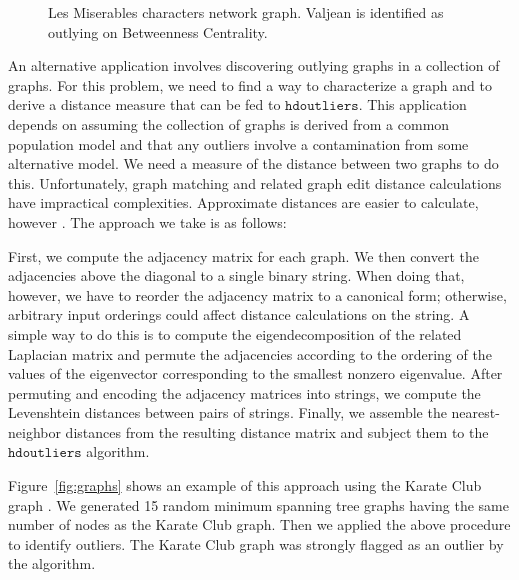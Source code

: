 \documentclass[12pt]{article}
\begin{document}
\begin{figure}[h]
\caption{\label{fig:lesmis} Les Miserables characters network graph. Valjean is identified as outlying on Betweenness Centrality.}
\end{figure}

An alternative application involves discovering outlying graphs in a collection of graphs. For this problem, we need to find a way to characterize a graph and to derive a distance measure that can be fed to $\mathtt{hdoutliers}$. This application depends on assuming the collection of graphs is derived from a common population model and that any outliers involve a contamination from some alternative model. We need a measure of the distance between two graphs to do this. Unfortunately, graph matching  and related graph edit distance calculations have impractical complexities. Approximate distances are easier to calculate, however \citep{graphMatchingUmeyama}. The approach we take is as follows: 

First, we compute the adjacency matrix for each graph. We then convert the adjacencies above the diagonal to a single binary string. When doing that, however, we have to reorder the adjacency matrix to a canonical form; otherwise, arbitrary input orderings could affect distance calculations on the string. A simple way to do this is to compute the eigendecomposition of the related Laplacian matrix and permute the adjacencies according to the ordering of the values of the eigenvector corresponding to the smallest nonzero eigenvalue. After permuting and encoding the adjacency matrices into strings, we compute the Levenshtein distances \citep{LevenshteinDistance} between pairs of strings. Finally, we assemble the nearest-neighbor distances from the resulting distance matrix and subject them to the $\mathtt{hdoutliers}$ algorithm.

Figure~\ref{fig:graphs} shows an example of this approach using the Karate Club graph \citep{KarateClub}. We generated 15 random minimum spanning tree graphs having the same number of nodes as the Karate Club graph. Then we applied the above procedure to identify outliers. The Karate Club graph was strongly flagged as an outlier by the algorithm.
\end{document}
